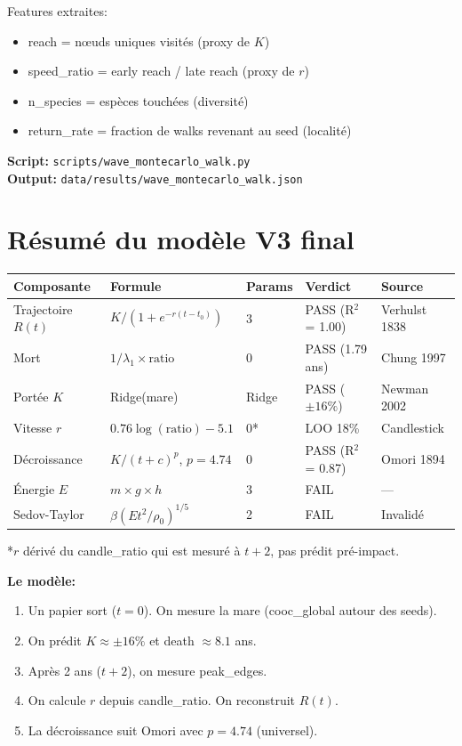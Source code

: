 \documentclass[11pt,a4paper]{article}
\begin{document}
Features extraites:
\begin{itemize}
\item reach = n\oe uds uniques visit\'es (proxy de $K$)
\item speed\_ratio = early reach / late reach (proxy de $r$)
\item n\_species = esp\`eces touch\'ees (diversit\'e)
\item return\_rate = fraction de walks revenant au seed (localit\'e)
\end{itemize}

\textbf{Script:} \texttt{scripts/wave\_montecarlo\_walk.py} \\
\textbf{Output:} \texttt{data/results/wave\_montecarlo\_walk.json}

\section{R\'esum\'e du mod\`ele V3 final}

\begin{center}
\begin{tabular}{lllll}
\toprule
\textbf{Composante} & \textbf{Formule} & \textbf{Params} & \textbf{Verdict} & \textbf{Source} \\
\midrule
Trajectoire $R(t)$ & $K/(1+e^{-r(t-t_0)})$ & 3 & PASS (R$^2$ = 1.00) & Verhulst 1838 \\
Mort & $1/\lambda_1 \times \text{ratio}$ & 0 & PASS (1.79 ans) & Chung 1997 \\
Port\'ee $K$ & Ridge(mare) & Ridge & PASS ($\pm 16\%$) & Newman 2002 \\
Vitesse $r$ & $0.76 \log(\text{ratio}) - 5.1$ & 0* & LOO 18\% & Candlestick \\
D\'ecroissance & $K/(t+c)^p$, $p = 4.74$ & 0 & PASS (R$^2$ = 0.87) & Omori 1894 \\
\'Energie $E$ & $m \times g \times h$ & 3 & FAIL & --- \\
Sedov-Taylor & $\beta(Et^2/\rho_0)^{1/5}$ & 2 & FAIL & Invalid\'e \\
\bottomrule
\end{tabular}
\end{center}

*$r$ d\'eriv\'e du candle\_ratio qui est mesur\'e \`a $t+2$, pas pr\'edit pr\'e-impact.

\textbf{Le mod\`ele:}
\begin{enumerate}
\item Un papier sort ($t = 0$). On mesure la mare (cooc\_global autour des seeds).
\item On pr\'edit $K \approx \pm 16\%$ et death $\approx 8.1$ ans.
\item Apr\`es 2 ans ($t + 2$), on mesure peak\_edges.
\item On calcule $r$ depuis candle\_ratio. On reconstruit $R(t)$.
\item La d\'ecroissance suit Omori avec $p = 4.74$ (universel).
\end{enumerate}
\end{document}
